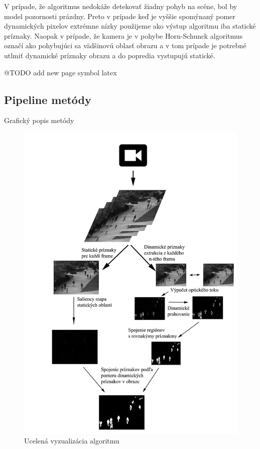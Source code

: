 V prípade, že algoritmus nedokáže detekovať žiadny pohyb na scéne, bol by model pozornosti prázdny.
Preto v prípade keď je vyššie spomýnaný pomer dynamických pixelov extrémne nízky použijeme ako výstup algoritmu iba statické príznaky.
Naopak v prípade, že kamera je v pohybe Horn-Schunck algoritmus označí ako pohybujúci sa vädšinovú oblasť obrazu a v tom prípade je potrebné utlmiť dynamické príznaky obrazu a do popredia vystupujú statické.

@TODO add new page symbol latex
\subsection{Pipeline metódy}
  Grafický popis metódy

  \begin{figure}[H]
    \centering
    \includegraphics[width=15cm]{pics/workflow.jpg}
    \caption{Ucelená vyzualizácia algoritmu}
    \vspace{10mm}
  \end{figure}

